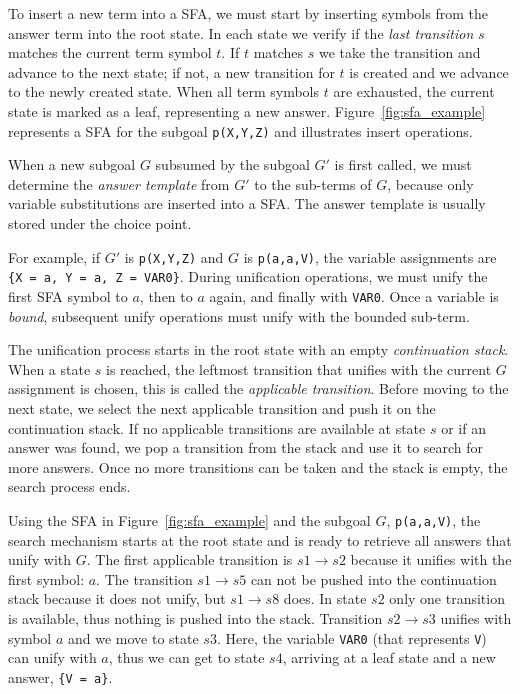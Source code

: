 To insert a new term into a SFA, we must start by inserting symbols from the answer term into the root state.
In each state we verify if the \textit{last transition} $s$ matches the current term symbol $t$. If $t$ matches $s$
we take the transition and advance to the next state; if not, a new transition for $t$ is created and we advance
to the newly created state. When all term symbols $t$ are exhausted, the current state is marked as a leaf,
representing a new answer.
Figure~\ref{fig:sfa_example} represents a SFA for the subgoal \texttt{p(X,Y,Z)} and
illustrates insert operations.

When a new subgoal $G$ subsumed by the subgoal $G'$ is first called, we must determine the \textit{answer template}
from $G'$ to the sub-terms of $G$, because only variable substitutions are inserted into a SFA.
The answer template is usually stored under the choice point.

For example, if $G'$ is \texttt{p(X,Y,Z)} and $G$ is \texttt{p(a,a,V)}, the variable assignments
are \texttt{\{X~=~a,~Y~=~a,~Z~=~VAR0\}}. During unification operations, we must unify the first SFA symbol
to $a$, then to $a$ again, and finally with \texttt{VAR0}.
Once a variable is \textit{bound}, subsequent unify operations must unify with the bounded sub-term.

The unification process starts in the root state with an empty \textit{continuation stack}.
When a state $s$ is reached, the leftmost transition that unifies with the current $G$ assignment is chosen,
this is called the \textit{applicable transition}.
Before moving to the next state, we select the next applicable transition and push it on the continuation stack.
If no applicable transitions are available at state $s$ or if an answer was found, we pop a transition from
the stack and use it to search for more answers. Once no more transitions can be taken and the stack is empty, the
search process ends.

Using the SFA in Figure~\ref{fig:sfa_example} and the subgoal $G$, \texttt{p(a,a,V)}, the search mechanism starts
at the root state and is ready to retrieve all answers that unify with $G$.
The first applicable transition is $s1 \rightarrow s2$ because it unifies with the first symbol: $a$. The transition
$s1 \rightarrow s5$ can not be pushed into the continuation stack because it does not unify, but $s1 \rightarrow s8$ does.
In state $s2$ only one transition is available, thus nothing is pushed into the stack.
Transition $s2 \rightarrow s3$ unifies with symbol $a$ and we move to state $s3$. Here, the variable \texttt{VAR0} (that represents \texttt{V})
can unify with $a$, thus we can get to state $s4$, arriving at a leaf state and a new answer, \texttt{\{V = a\}}.

